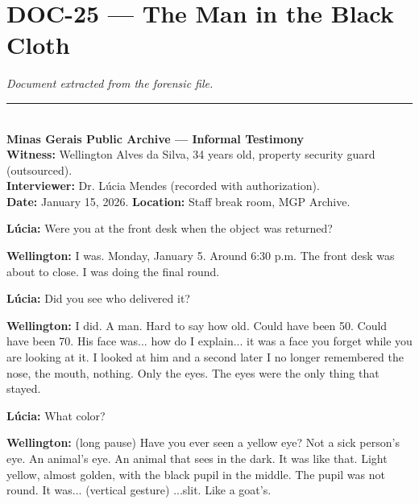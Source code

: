 \section*{\textbf{DOC-25} --- The Man in the Black Cloth}

\noindent \textit{Document extracted from the forensic file.}

\vspace{0.5em}\noindent\rule{\textwidth}{0.5pt}\vspace{0.5em}

\\[-0.2em]

\noindent \textbf{Minas Gerais Public Archive --- Informal Testimony}\\
\noindent \textbf{Witness:} Wellington Alves da Silva, 34 years old, property security guard (outsourced).\\
\noindent \textbf{Interviewer:} Dr. Lúcia Mendes (recorded with authorization).\\
\noindent\textbf{Date:} January 15, 2026. \textbf{Location:} Staff break room, MGP Archive.

\noindent \textbf{Lúcia:} Were you at the front desk when the object was returned?

\noindent \textbf{Wellington:} I was. Monday, January 5. Around 6:30 p.m. The front desk was about to close. I was doing the final round.

\noindent \textbf{Lúcia:} Did you see who delivered it?

\noindent \textbf{Wellington:} I did. A man. Hard to say how old. Could have been 50. Could have been 70. His face was... how do I explain... it was a face you forget while you are looking at it. I looked at him and a second later I no longer remembered the nose, the mouth, nothing. Only the eyes. The eyes were the only thing that stayed.

\noindent \textbf{Lúcia:} What color?

\noindent \textbf{Wellington:} (long pause) Have you ever seen a yellow eye? Not a sick person's eye. An animal's eye. An animal that sees in the dark. It was like that. Light yellow, almost golden, with the black pupil in the middle. The pupil was not round. It was... (vertical gesture) ...slit. Like a goat's.


